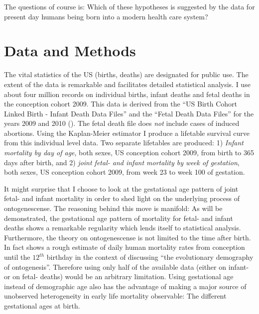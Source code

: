 \documentclass[
  12pt
]{scrartcl}
\begin{document}
The questions of course is: Which of these hypotheses is suggested by the data for present day humans being born into a modern health care system?

\section{Data and Methods} %
\label{sec:data_and_methods}

The vital statistics of the US (births, deaths) are designated for public use. The extent of the data is remarkable and facilitates detailed statistical analysis. I use about four million records on individual births, infant deaths and fetal deaths in the conception cohort 2009. This data is derived from the \enquote{US Birth Cohort Linked Birth - Infant Death Data Files} and the \enquote{Fetal Death Data Files} for the years 2009 and 2010 (\cite{DVS2015}). The fetal death file does \emph{not} include cases of induced abortions. Using the Kaplan-Meier estimator I produce a lifetable survival curve from this individual level data. Two separate lifetables are produced: 1) \emph{Infant mortality by day of age}, both sexes, US conception cohort 2009, from birth to 365 days after birth, and 2) \emph{joint fetal- and infant mortality by week of gestation}, both sexes, US conception cohort 2009, from week 23 to week 100 of gestation.

It might surprise that I choose to look at the gestational age pattern of joint fetal- and infant mortality in order to shed light on the underlying process of ontogenescense. The reasoning behind this move is manifold: As will be demonstrated, the gestational age pattern of mortality for fetal- and infant deaths shows a remarkable regularity which lends itself to statistical analysis. Furthermore, the theory on ontogenescense is not limited to the time after birth. In fact \textcite{Levitis2011} shows a rough estimate of daily human mortality rates from conception until the $12^{th}$ birthday in the context of discussing \enquote{the evolutionary demography of ontogenesis}. Therefore using only half of the available data (either on infant- or on fetal- deaths) would be an arbitrary limitation. Using gestational age instead of demographic age also has the advantage of making a major source of unobserved heterogeneity in early life mortality observable: The different gestational ages at birth.
\end{document}
